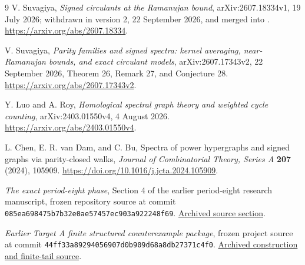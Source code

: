 \documentclass[11pt]{article}
\theoremstyle{remark}\newtheorem{remark}[theorem]{Remark}
\begin{document}
\begin{thebibliography}{9}
V. Suvagiya,
\emph{Signed circulants at the Ramanujan bound},
arXiv:2607.18334v1, 19 July 2026;
withdrawn in version 2, 22 September 2026, and merged into
\cite{Suvagiya2026}.
\url{https://arxiv.org/abs/2607.18334}.

V. Suvagiya,
\emph{Parity families and signed spectra: kernel averaging,
near-Ramanujan bounds, and exact circulant models},
arXiv:2607.17343v2, 22 September 2026,
Theorem 26, Remark 27, and Conjecture 28.
\url{https://arxiv.org/abs/2607.17343v2}.

Y. Luo and A. Roy,
\emph{Homological spectral graph theory and weighted cycle counting},
arXiv:2403.01550v4, 4 August 2026.
\url{https://arxiv.org/abs/2403.01550v4}.

L. Chen, E. R. van Dam, and C. Bu,
Spectra of power hypergraphs and signed graphs via parity-closed walks,
\emph{Journal of Combinatorial Theory, Series A} \textbf{207} (2024),
105909.
\url{https://doi.org/10.1016/j.jcta.2024.105909}.

\emph{The exact period-eight phase}, Section 4 of the earlier period-eight
research manuscript, frozen repository source at commit
\texttt{085ea698475b7b32e0ae57457ec903a922248f69}.
\href{https://github.com/whzy3185/math/blob/085ea698475b7b32e0ae57457ec903a922248f69/research/paper_strengthening/manuscript_period8_jgt/sections_en/04_period8_exact.tex}{Archived source section}.

\emph{Earlier Target A finite structured counterexample package},
frozen project source at commit
\texttt{44ff33a89294056907d0b909d68a8db27371c4f0}.
\href{https://github.com/whzy3185/math/blob/44ff33a89294056907d0b909d68a8db27371c4f0/research/proofs/task54/TARGET_A_FINITE_STRUCTURED_COUNTEREXAMPLE_TAIL.md}{Archived construction and finite-tail source}.

\end{thebibliography}
\end{document}
